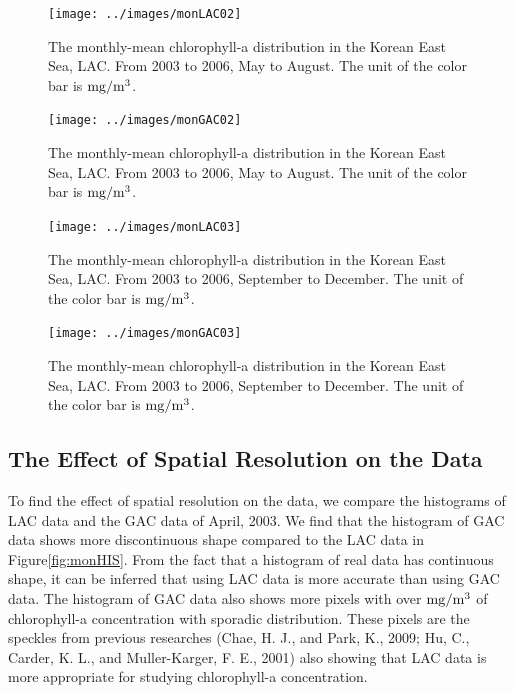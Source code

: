 \begin{figure}[p]
	\centering
	\texttt{[image: ../images/monLAC02]}\\
	\caption{The monthly-mean chlorophyll-a distribution in the Korean East Sea, LAC. From 2003 to 2006, May to August. The unit of the color bar is $\rm mg/m^3$.}
	\label{fig:monLAC02}
\end{figure}

\begin{figure}[p]
	\centering
	\texttt{[image: ../images/monGAC02]}\\
	\caption{The monthly-mean chlorophyll-a distribution in the Korean East Sea, LAC. From 2003 to 2006, May to August. The unit of the color bar is $\rm mg/m^3$.}
	\label{fig:monGAC02}
\end{figure}

\begin{figure}[p]
	\centering
	\texttt{[image: ../images/monLAC03]}\\
	\caption{The monthly-mean chlorophyll-a distribution in the Korean East Sea, LAC. From 2003 to 2006, September to December. The unit of the color bar is $\rm mg/m^3$.}
	\label{fig:monLAC03}
\end{figure}

\begin{figure}[p]
	\centering
	\texttt{[image: ../images/monGAC03]}\\
	\caption{The monthly-mean chlorophyll-a distribution in the Korean East Sea, LAC. From 2003 to 2006, September to December. The unit of the color bar is $\rm mg/m^3$.}
	\label{fig:monGAC03}
\end{figure}


\newpage
\subsection{The Effect of Spatial Resolution on the Data}
 
To find the effect of spatial resolution on the data, we compare the histograms of LAC data and the GAC data of April, 2003. We find that the histogram of GAC data shows more discontinuous shape compared to the LAC data in Figure\ref{fig:monHIS}. From the fact that a histogram of real data has continuous shape, it can be inferred that using LAC data is more accurate than using GAC data. The histogram of GAC data also shows more pixels with over $\rm mg/m^3$ of chlorophyll-a concentration with sporadic distribution. These pixels are the speckles from previous researches (Chae, H. J., and Park, K., 2009; Hu, C., Carder, K. L., and Muller-Karger, F. E., 2001) also showing that LAC data is more appropriate for studying chlorophyll-a concentration.
  
